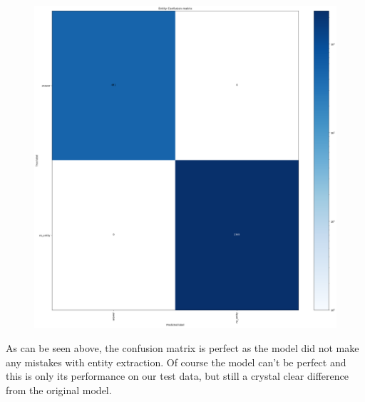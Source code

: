 \documentclass[hidelinks, 11pt]{article}
\begin{document}
\begin{figure}
  \includegraphics[width=\columnwidth]{../Rasa/Evaluation/Clean_Model/DIETClassifier_confusion_matrix.png}
\end{figure}

As can be seen above, the confusion matrix is perfect as the model did not make any mistakes with entity extraction. Of course the model can't be perfect and this is only its performance on our test data, but still a crystal clear difference from the original model.
\end{document}
